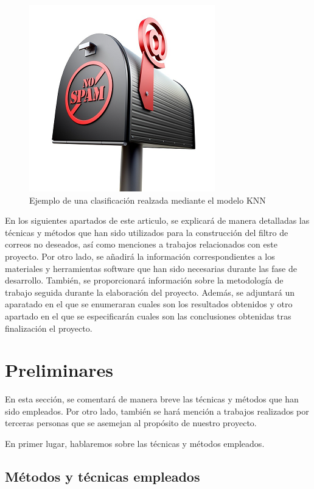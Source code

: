 \documentclass[conference,a4paper]{IEEEtran}
\begin{document}
\begin{figure}
  \centering
  \includegraphics{spam}
  \caption{Ejemplo de una clasificación realzada mediante el modelo KNN}
  \label{fig:spam}
\end{figure}


En los siguientes apartados de este articulo, se explicará de manera detalladas las técnicas y métodos que han sido utilizados para la construcción del filtro de correos no deseados, así como menciones a trabajos relacionados con este proyecto. Por otro lado, se añadirá la información correspondientes a los materiales y herramientas software que han sido necesarias durante las fase de desarrollo. También, se proporcionará información sobre la metodología de trabajo seguida durante la elaboración del proyecto. Además, se adjuntará  un aparatado en el que se enumeraran cuales son los resultados obtenidos y otro apartado en el que se especificarán cuales son las conclusiones obtenidas tras finalización el proyecto.



\section{Preliminares}

En esta sección, se comentará de manera breve las técnicas y métodos que han sido empleados. Por otro lado, también se hará mención a trabajos realizados por terceras personas que se asemejan al propósito de nuestro proyecto. 

En primer lugar, hablaremos sobre las técnicas y métodos empleados.


\subsection{Métodos y técnicas empleados}
\end{document}
